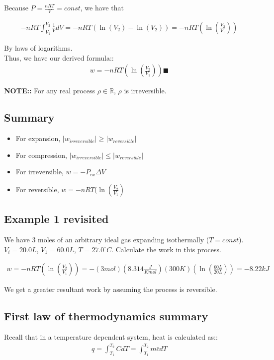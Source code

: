 \documentclass[12pt]{article}
\begin{document}
Because $P=\frac{nRT}{V}=const$, we have that

\begin{align*}
    -nRT\int_{V_1}^{V_2}\frac{1}{V}dV=-nRT(\ln(V_2)-\ln(V_2))=-nRT(\ln(\frac{V_2}{V_1}))
\end{align*}

By laws of logarithms.\\Thus, we have our derived formula::
\begin{align*}
    w=-nRT(\ln(\frac{V_2}{V_1})) \blacksquare
\end{align*}

\textbf{NOTE::} For any real process $\rho\in\mathbb{R}$, $\rho$ is irreversible.\\

\subsection*{Summary}

\begin{itemize}
    \item For expansion, $|w_{irreversible}|\geq |w_{reversible}|$
    \item For compression, $|w_{irreversible}|\leq |w_{reversible}|$
    \item For irreversible, $w=-P_{ex}\Delta V$
    \item For reversible, $w=-nRT(\ln(\frac{V_2}{V_1})$
\end{itemize}

\subsection*{Example 1 revisited}
We have 3 moles of an arbitrary ideal gas expanding isothermally ($T=const$). $V_i=20.0L$, $V_1=60.0L$, $T=27.0^{\circ}C$. Calculate the work in this process.

\begin{align*}
    w=-nRT(\ln(\frac{V_2}{V_1}))=-(3mol)(8.314\frac{J}{Kmol})(300K)(\ln(\frac{60L}{20L}))=-8.22kJ
\end{align*}

We get a greater resultant work by assuming the process is reversible.

\subsection*{First law of thermodynamics summary}
Recall that in a temperature dependent system, heat is calculated as::
\begin{align*}
    q=\int_{T_1}^{T_2}CdT=\int_{T_1}^{T_2}m\bar{c}dT
\end{align*}
\end{document}
